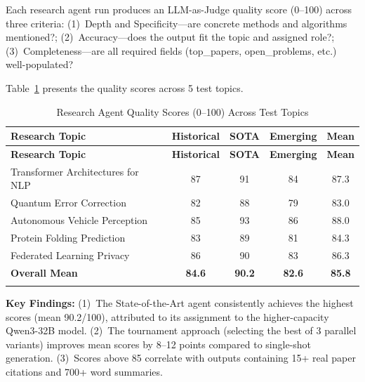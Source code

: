 \documentclass[a4paper,12pt,openany]{report}
\begin{document}
Each research agent run produces an LLM-as-Judge quality score (0--100) across three criteria: (1)~Depth and Specificity---are concrete methods and algorithms mentioned?; (2)~Accuracy---does the output fit the topic and assigned role?; (3)~Completeness---are all required fields (top\_papers, open\_problems, etc.) well-populated?

Table~\ref{tab:agent_scores} presents the quality scores across 5 test topics.

\begin{longtable}{|p{4.5cm}|c|c|c|c|}
\hline
\textbf{Research Topic} & \textbf{Historical} & \textbf{SOTA} & \textbf{Emerging} & \textbf{Mean} \\
\hline
\endfirsthead
\hline
\textbf{Research Topic} & \textbf{Historical} & \textbf{SOTA} & \textbf{Emerging} & \textbf{Mean} \\
\hline
\endhead
\hline
\endfoot
Transformer Architectures for NLP & 87 & 91 & 84 & 87.3 \\
\hline
Quantum Error Correction & 82 & 88 & 79 & 83.0 \\
\hline
Autonomous Vehicle Perception & 85 & 93 & 86 & 88.0 \\
\hline
Protein Folding Prediction & 83 & 89 & 81 & 84.3 \\
\hline
Federated Learning Privacy & 86 & 90 & 83 & 86.3 \\
\hline
\textbf{Overall Mean} & \textbf{84.6} & \textbf{90.2} & \textbf{82.6} & \textbf{85.8} \\
\hline

\caption{Research Agent Quality Scores (0--100) Across Test Topics}
\label{tab:agent_scores}
\end{longtable}

\textbf{Key Findings:} (1)~The State-of-the-Art agent consistently achieves the highest scores (mean 90.2/100), attributed to its assignment to the higher-capacity Qwen3-32B model. (2)~The tournament approach (selecting the best of 3 parallel variants) improves mean scores by 8--12 points compared to single-shot generation. (3)~Scores above 85 correlate with outputs containing 15+ real paper citations and 700+ word summaries.
\end{document}

